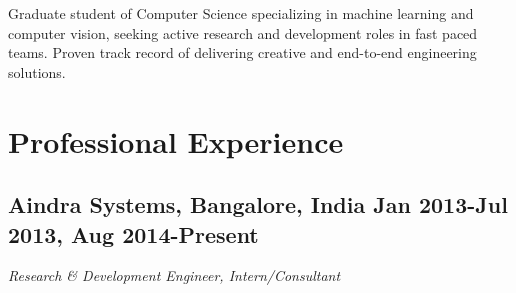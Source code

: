 \documentclass[10pt,letterpaper,sans]{moderncv}        %
\begin{document}
\pagestyle{empty}
\makecvtitle

\small{Graduate student of Computer Science specializing in machine learning and computer vision, seeking active research and development roles in fast paced teams. Proven track record of delivering creative and end-to-end engineering solutions.}

\section{Professional Experience}

\vspace{2pt}

\subsection{Aindra Systems, Bangalore, India \small{Jan 2013-Jul 2013, Aug 2014-Present}}
\textit{Research \& Development Engineer, Intern/Consultant}
\end{document}
